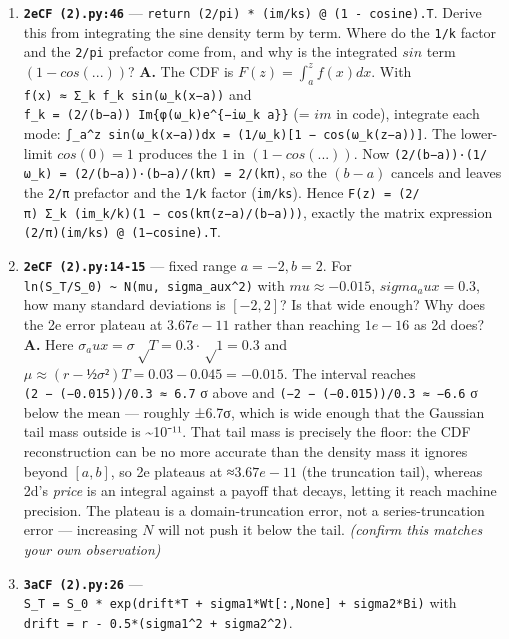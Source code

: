 \documentclass[
  11pt,
]{article}
\begin{document}
\begin{enumerate}
  That is exactly \(dot(cf_part, Vk)\) --- Parseval's theorem turns the
  function inner product into a coefficient dot product.
\item
  \textbf{\texttt{2eCF\ (2).py:46}} ---
  \texttt{return\ (2/pi)\ *\ (im/ks)\ @\ (1\ -\ cosine).T}. Derive this
  from integrating the sine density term by term. Where do the
  \texttt{1/k} factor and the \texttt{2/pi} prefactor come from, and why
  is the integrated \(sin\) term \((1 - cos(...))\)? \textbf{A.} The CDF
  is \(F(z) = ∫_a^z f(x)dx\). With
  \texttt{f(x)\ ≈\ Σ\_k\ f\_k\ sin(ω\_k(x−a))} and
  \texttt{f\_k\ =\ (2/(b−a))\ Im\{φ(ω\_k)e\^{}\{−iω\_k\ a\}\}} (= \(im\)
  in code), integrate each mode:
  \texttt{∫\_a\^{}z\ sin(ω\_k(x−a))dx\ =\ (1/ω\_k){[}1\ −\ cos(ω\_k(z−a)){]}}.
  The lower-limit \(cos(0)=1\) produces the \(1\) in \((1 − cos(...))\).
  Now \texttt{(2/(b−a))·(1/ω\_k)\ =\ (2/(b−a))·(b−a)/(kπ)\ =\ 2/(kπ)},
  so the \((b−a)\) cancels and leaves the \texttt{2/π} prefactor and the
  \texttt{1/k} factor (\texttt{im/ks}). Hence
  \texttt{F(z)\ =\ (2/π)\ Σ\_k\ (im\_k/k)(1\ −\ cos(kπ(z−a)/(b−a)))},
  exactly the matrix expression \texttt{(2/π)(im/ks)\ @\ (1−cosine).T}.
\item
  \textbf{\texttt{2eCF\ (2).py:14-15}} --- fixed range \(a=-2, b=2\).
  For \texttt{ln(S\_T/S\_0)\ \textasciitilde{}\ N(mu,\ sigma\_aux\^{}2)}
  with \(mu ≈ -0.015\), \(sigma_aux = 0.3\), how many standard
  deviations is \([-2,2]\)? Is that wide enough? Why does the 2e error
  plateau at \(3.67e-11\) rather than reaching \(1e-16\) as 2d does?
  \textbf{A.} Here \(σ_aux = σ√T = 0.3·√1 = 0.3\) and
  \(μ ≈ (r−½σ²)T = 0.03−0.045 = −0.015\). The interval reaches
  \texttt{(2\ −\ (−0.015))/0.3\ ≈\ 6.7} σ above and
  \texttt{(−2\ −\ (−0.015))/0.3\ ≈\ −6.6} σ below the mean --- roughly
  ±6.7σ, which is wide enough that the Gaussian tail mass outside is
  \textasciitilde10⁻¹¹. That tail mass is precisely the floor: the CDF
  reconstruction can be no more accurate than the density mass it
  ignores beyond \([a,b]\), so 2e plateaus at ≈\(3.67e-11\) (the
  truncation tail), whereas 2d's \emph{price} is an integral against a
  payoff that decays, letting it reach machine precision. The plateau is
  a domain-truncation error, not a series-truncation error ---
  increasing \(N\) will not push it below the tail. \emph{(confirm this
  matches your own observation)}
\item
  \textbf{\texttt{3aCF\ (2).py:26}} ---
  \texttt{S\_T\ =\ S\_0\ *\ exp(drift*T\ +\ sigma1*Wt{[}:,None{]}\ +\ sigma2*Bi)}
  with \texttt{drift\ =\ r\ -\ 0.5*(sigma1\^{}2\ +\ sigma2\^{}2)}.

\end{enumerate}
\end{document}
